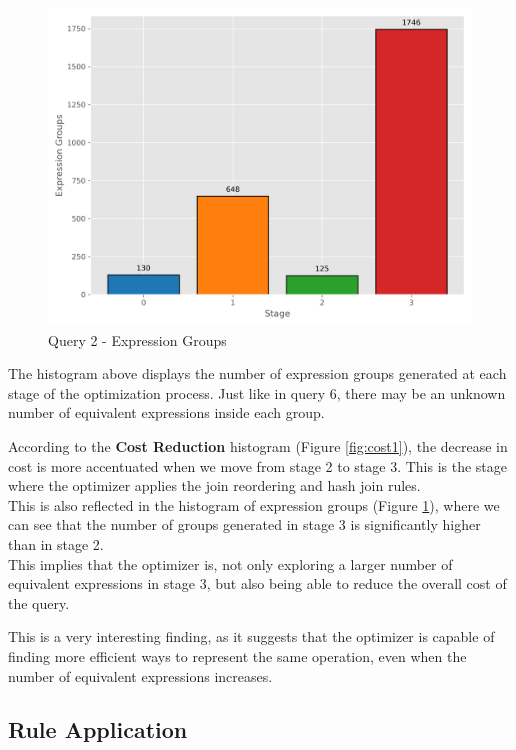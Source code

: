 \documentclass[a4paper,12pt]{scrreprt}
\begin{document}
\begin{figure}[H]
    \centering
    \includegraphics[width=\linewidth]{img/expression_groups/q2_expression_groups.png}
    \caption{Query 2 - Expression Groups}
    \label{fig:exprgroups2}
\end{figure}

The histogram above displays the number of expression groups generated at each stage of the optimization process. Just like in query 6, there may be an unknown number of equivalent expressions inside each group. 

According to the \textbf{Cost Reduction} histogram (Figure \ref{fig:cost1}), the decrease in cost is more accentuated when we move from stage 2 to stage 3. This is the stage where the optimizer applies the join reordering and hash join rules. \\
This is also reflected in the histogram of expression groups (Figure \ref{fig:exprgroups2}), where we can see that the number of groups generated in stage 3 is significantly higher than in stage 2. \\
This implies that the optimizer is, not only exploring a larger number of equivalent expressions in stage 3, but also being able to reduce the overall cost of the query. 

This is a very interesting finding, as it suggests that the optimizer is capable of finding more efficient ways to represent the same operation, even when the number of equivalent expressions increases. 

\subsection{Rule Application}
\end{document}
